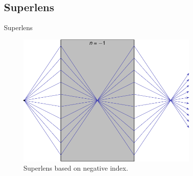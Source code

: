 \subsection{Superlens}

\begin{frame}{Superlens}
    \begin{figure}
        \centering
        \includegraphics[width=0.8\textwidth]{Figures/LH_superlens.pdf}
        \caption{Superlens based on negative index.}
        \label{fig:LH_superlens}
    \end{figure}
    
\end{frame}